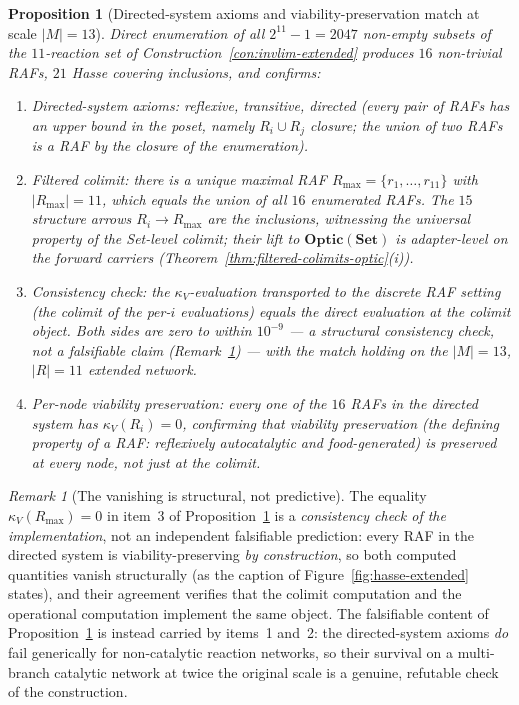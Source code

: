 \documentclass[11pt,a4paper]{article}
\theoremstyle{plain}
\newtheorem{proposition}[theorem]{Proposition}
\theoremstyle{definition}
\theoremstyle{remark}
\newtheorem{remark}[theorem]{Remark}
\newcommand{\kk}{\kappa_{\!V}}
\newcommand{\Optic}{\mathbf{Optic}}
\begin{document}
\begin{proposition}[Directed-system axioms and viability-preservation
match at scale $|M|=13$]
\label{prop:invlim-extended}
Direct enumeration of all $2^{11}-1=2047$ non-empty subsets of the
$11$-reaction set of Construction~\ref{con:invlim-extended} produces $16$ non-trivial
RAFs, $21$ Hasse covering inclusions, and confirms:
\begin{enumerate}[leftmargin=1.4em,itemsep=1pt]
\item \emph{Directed-system axioms}: reflexive, transitive, directed
  (every pair of RAFs has an upper bound in the poset, namely
  $R_i\cup R_j$ closure; the union of two RAFs is a RAF by the
  closure of the enumeration).
\item \emph{Filtered colimit}: there is a unique maximal RAF
  $R_{\max}=\{r_1,\ldots,r_{11}\}$ with $|R_{\max}|=11$, which
  equals the union of all $16$ enumerated RAFs. The $15$ structure
  arrows $R_i \to R_{\max}$ are the inclusions, witnessing the
  universal property of the Set-level colimit; their lift to
  $\Optic(\mathbf{Set})$ is adapter-level on the forward carriers
  (Theorem~\ref{thm:filtered-colimits-optic}(i)).
\item \emph{Consistency check}: the $\kk$-evaluation transported
  to the discrete RAF setting (the colimit of the per-$i$
  evaluations) equals the direct evaluation at the colimit object.
  Both sides are zero to within $10^{-9}$ --- a structural
  consistency check, not a falsifiable claim
  (Remark~\ref{rem:zero-zero}) --- with the match holding on the
  $|M|=13$, $|R|=11$ extended network.
\item \emph{Per-node viability preservation}: every one of the $16$
  RAFs in the directed system has $\kk(R_i)=0$, confirming that
  viability preservation (the defining property of a RAF: reflexively
  autocatalytic and food-generated) is preserved at every node, not
  just at the colimit.
\end{enumerate}
\end{proposition}

\begin{remark}[The vanishing is structural, not predictive]
\label{rem:zero-zero}
The equality $\kk(R_{\max})=0$ in item~3 of
Proposition~\ref{prop:invlim-extended} is a \emph{consistency check
of the implementation}, not an independent falsifiable prediction:
every RAF in the directed system is viability-preserving
\emph{by construction}, so both computed quantities vanish
structurally (as the caption of Figure~\ref{fig:hasse-extended}
states), and their agreement verifies that the colimit computation
and the operational computation implement the same object. The
falsifiable content of Proposition~\ref{prop:invlim-extended} is
instead carried by items~1 and~2: the directed-system axioms
\emph{do} fail generically for non-catalytic reaction networks, so
their survival on a multi-branch catalytic network at twice the
original scale is a genuine, refutable check of the construction.
\end{remark}
\end{document}
